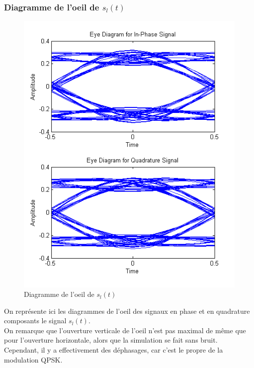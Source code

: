 \documentclass[11pt]{article}
\begin{document}
		\subsubsection{Diagramme de l'oeil de $s_l(t)$}
			\begin{figure}[!h]
				\centering
				\includegraphics[scale=0.5]{images/Q424.png}
				\caption{Diagramme de l'oeil de $s_l(t)$}
				\label{Q424}
			\end{figure}
		On représente ici les diagrammes de l'oeil des signaux en phase et en quadrature composants le signal $s_l(t)$.\\
			On remarque que l'ouverture verticale de l'oeil n'est pas maximal de même que pour l'ouverture horizontale, alors que la simulation se fait sans bruit. Cependant, il y a effectivement des déphasages, car c'est le propre de la modulation QPSK.
			
\end{document}
